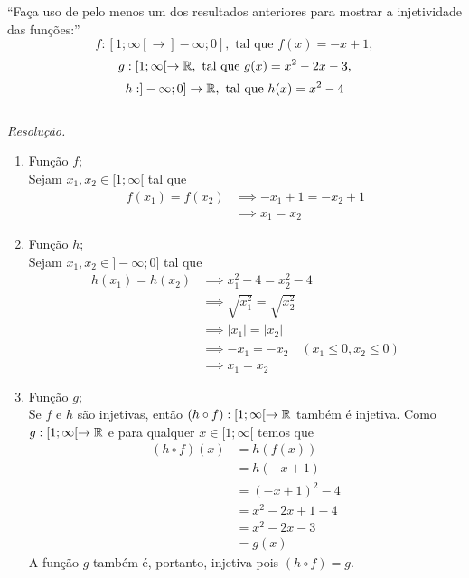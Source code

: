 \enquote{Faça uso de pelo menos um dos resultados anteriores para mostrar a injetividade das funções:}
\begin{displaymath}
    f: [1; \infty[ \rightarrow ]-\infty; 0], \text{ tal que } f(x) = -x + 1, 
\end{displaymath}
\begin{displaymath}
    g: [1; \infty[ \rightarrow \mathbb R, \text{ tal que } g(x) = x^2 - 2x - 3,
\end{displaymath}
\begin{displaymath}
    h: ]-\infty; 0] \rightarrow \mathbb R, \text { tal que } h(x) = x^2 - 4
\end{displaymath} \\
\emph{Resolução.}
\begin{enumerate}
    \item Função $f$; \\
    Sejam $x_1, x_2 \in [1; \infty[$ tal que
    \begin{align*}
        f(x_1) = f(x_2) & \implies -x_1 + 1 = -x_2 + 1 \\ & \implies
        x_1 = x_2
    \end{align*}
    \item Função $h$; \\
    Sejam $x_1, x_2 \in ]-\infty; 0]$ tal que
    \begin{align*}
        h(x_1) = h(x_2) & \implies x_1^2 - 4 = x_2^2 - 4 \\ & \implies
        \sqrt{x_1^2} = \sqrt{x_2^2} \\ & \implies
        |x_1| = |x_2| \\ & \implies
        -x_1 = -x_2 \quad (x_1 \le 0, x_2 \le 0)\\ & \implies
        x_1 = x_2
    \end{align*}
    \item Função $g$; \\
    Se $f$ e $h$ são injetivas, então $(h \circ f): [1; \infty[ \rightarrow \mathbb R$ também é injetiva. Como $g: [1; \infty[ \rightarrow \mathbb R$ e para qualquer $x \in [1; \infty[$ temos que
    \begin{align*}
        (h \circ f)(x) & = h(f(x)) \\ & =
        h(-x + 1) \\ & =
        (-x + 1)^2 - 4 \\ & =
        x^2 - 2x + 1 - 4 \\ & =
        x^2 - 2x - 3 \\ & =
        g(x)         
    \end{align*}
    A função $g$ também é, portanto, injetiva pois $(h \circ f) = g$.
\end{enumerate}